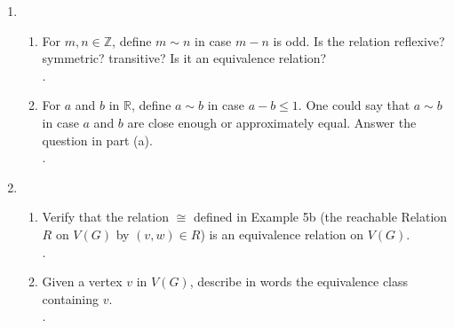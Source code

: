 \documentclass[11pt]{article}
\newcommand{\R}{\mathbb{R}}
\newcommand{\Z}{\mathbb{Z}}
\begin{document}
\begin{enumerate}
\[\begin{tikzpicture}
	\begin{scope}[>={Stealth[black]},
	              every node/.style={fill=white,circle},
	              every edge/.style={draw=black}]
	    	\path (1) edge (2);
	    	\path (2) edge (3);
		\path (3) edge[loop below] (3);
	\end{scope}
	\end{tikzpicture}
	\cong
	\begin{tikzpicture}
	\begin{scope}[every node/.style={circle,thick,draw}]
	    \node (1) at (0,0) {$1$};
	    \node (2) at (2,0) {$2$};
	    \node (3) at (1,-1) {$3$};
	\end{scope}
	
	\begin{scope}[>={Stealth[black]},
	              every node/.style={fill=white,circle},
	              every edge/.style={draw=black}]
	    	\path (1) edge[loop above] (1);
	    	\path (1) edge (3);
		\path (3) edge (2);
	\end{scope}
	\end{tikzpicture}
\]
	\begin{enumerate}
	\item Give a picture of another graph isomorphic to these two.\\
	.
	\item Find a graph with vertex set $\{1,2,3\}$ that is not isomorphic to the graphs yet has three edges and exactly one is 
	a loop.\\
	.
	\item Find another example as in part(b) that isn't isomorphic to the answer of part(b) and the other two graphs.\\
	.
	\item Show that $\cong$ is an equivalence relation on the set of all graphs with the vertex set $\{1,2,...,n\}$.\\
	.
	\end{enumerate}
\setcounter{enumi}{7}
\item
	\begin{enumerate}
	\item For $m,n\in\Z$, define $m\sim n$ in case $m-n$ is odd. Is the relation reflexive? symmetric? transitive? Is it an 
	equivalence relation?\\
	.
	\item For $a$ and $b$ in $\R$, define $a\sim b$ in case $a-b\leq 1$. One could say that $a\sim b$ in case $a$ and $b$ are 
	close enough or approximately equal. Answer the question in part (a).\\
	.
	\end{enumerate}
\setcounter{enumi}{16}
\item 
	\begin{enumerate}
	\item Verify that the relation $\cong$ defined in Example 5b (the reachable Relation $R$ on $V(G)$ by $(v,w)\in R$) is an 
	equivalence relation on $V(G)$.\\
	.
	\item Given a vertex $v$ in $V(G)$, describe in words the equivalence class containing $v$.\\
	.
	\end{enumerate}

\end{enumerate}
\end{document}

